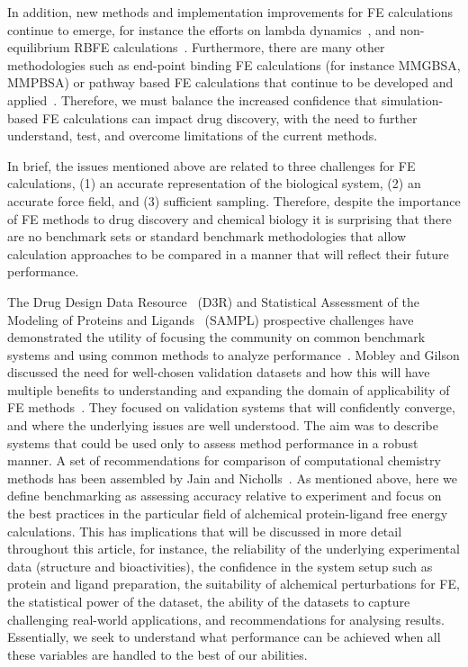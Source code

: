 \documentclass[9pt,bestpractices,pubversion]{livecoms}
\begin{document}
In addition, new methods and implementation improvements for FE calculations continue to emerge, for instance the efforts on lambda dynamics~\cite{knightMultisiteDynamicsSimulated2011,vilseckPredictingBindingFree2018}, and non-equilibrium RBFE calculations~\cite{gapsysLargeScaleRelative2020,rufaChemicalAccuracyAlchemical2020}. 
Furthermore, there are many other methodologies such as end-point binding FE calculations (for instance MMGBSA, MMPBSA) or pathway based FE calculations that continue to be developed and applied~\cite{genheden_MM_2015}. Therefore, we must balance the increased confidence that simulation-based FE calculations can impact drug discovery, with the need to further understand, test, and overcome limitations of the current methods.

In brief, the issues mentioned above are related to three challenges for FE calculations,
(1) an accurate representation of the biological system, 
(2) an accurate force field, and 
(3) sufficient sampling. 
Therefore, despite the importance of FE methods to drug discovery and chemical biology it is surprising that there are no benchmark sets or standard benchmark methodologies that allow calculation approaches to be compared in a manner that will reflect their future performance. 

The Drug Design Data Resource~\cite{amaro_drug_2021} (D3R) and Statistical Assessment of the Modeling of Proteins and Ligands~\cite{mobley_sampl_2021} (SAMPL) prospective challenges have demonstrated the utility of focusing the community on common benchmark systems and using common methods to analyze performance~\cite{geballe_sampl2_2010,muddana_blind_2012,muddana_prediction_2012,muddana_sampl4_2014,gathiaka_d3r_2016,bannan_blind_2016,yin_overview_2017,gaieb_d3r_2018,gaieb_d3r_2019,parks_d3r_2020}. Mobley and Gilson discussed the need for well-chosen validation datasets and how this will have multiple benefits to understanding and expanding the domain of applicability of FE methods~\cite{mobleyPredictingBindingFree2017}. They focused on validation systems that will confidently converge, and where the underlying issues are well understood. The aim was to describe systems that could be used only to assess method performance in a robust manner. A set of recommendations for comparison of computational chemistry methods has been assembled by Jain and Nicholls~\cite{jain2008recommendations}. As mentioned above, here we define benchmarking as assessing accuracy relative to experiment and focus on the best practices in the particular field of alchemical protein-ligand free energy calculations. This has implications that will be discussed in more detail throughout this article, for instance, the reliability of the underlying experimental data (structure and bioactivities), the confidence in the system setup such as protein and ligand preparation, the suitability of alchemical perturbations for FE, the statistical power of the dataset, the ability of the datasets to capture challenging real-world applications, and recommendations for analysing results. Essentially, we seek to understand what performance can be achieved when all these variables are handled to the best of our abilities.    
\end{document}
